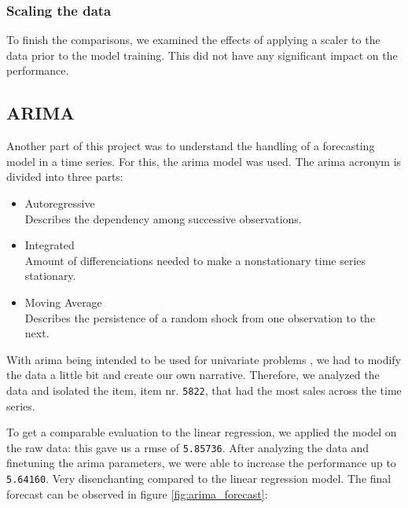 \subsubsection{Scaling the data }

To finish the comparisons, we examined the effects of applying a scaler to the data prior to the model training. This did not have any significant impact on the performance.


\subsection{ARIMA}

Another part of this project was to understand the handling of a forecasting model in a time series. 
For this, the \acrfull{arima} model was used. The \acrshort{arima} acronym is divided into three parts: \cite{MultivariateStatisticsARIMA}

\begin{itemize}
	\vspace*{-3mm}
	\item Autoregressive\\
	Describes the dependency among successive observations.
	\vspace*{-3mm}
	\item Integrated\\
	Amount of differenciations needed to make a nonstationary time series stationary.
	\vspace*{-3mm}
	\item Moving Average\\
	Describes the persistence of a random shock from one observation to the next.
\end{itemize}

With \acrshort{arima} being intended to be used for univariate problems \cite{Gron2017HandsOnML}, we had to modify the data a little bit and create our own narrative. Therefore, we analyzed the data and isolated the item, item nr. \texttt{5822}, that had the most sales across the time series.

To get a comparable evaluation to the linear regression, we applied the model on the raw data: this gave us a \acrshort{rmse} of \texttt{5.85736}. After analyzing the data and finetuning the \acrshort{arima} parameters, we were able to increase the performance up to \texttt{5.64160}. Very disenchanting compared to the linear regression model. The final forecast can be observed in figure \ref{fig:arima_forecast}:

